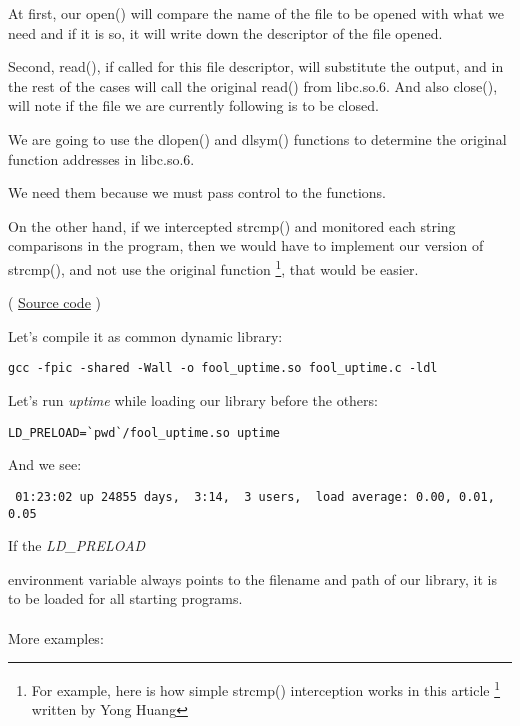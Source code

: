 At first, our open() will compare the name of the file to be opened with what we need and if it is so,
it will write down the descriptor of the file opened.

Second, read(), if called for this file descriptor, will substitute the output,
and in the rest of the cases will call the original read() from libc.so.6.
And also close(), 
will note if the file we are currently following is to be closed.


We are going to use the dlopen() and dlsym() functions to determine the original function addresses in libc.so.6.

We need them because we must pass control to the  functions.


On the other hand, if we intercepted strcmp() and monitored each string
comparisons in the program, then we would have to implement our version of strcmp(), and not
use the original function
\footnote{For example, here is how simple strcmp() interception works in this article
\footnote{\href{https://yurichev.com/mirrors/LD_PRELOAD/Yong%20Huang%20LD_PRELOAD.txt}{yurichev.com}}
written by Yong Huang}, that would be easier.


( \href{\RepoURL/OS/LD_PRELOAD/fool_uptime.c}{Source code} )

Let's compile it as common dynamic library:

\begin{lstlisting}
gcc -fpic -shared -Wall -o fool_uptime.so fool_uptime.c -ldl
\end{lstlisting}

Let's run \emph{uptime}
while loading our library before the others:

\begin{lstlisting}
LD_PRELOAD=`pwd`/fool_uptime.so uptime
\end{lstlisting}

And we see:

\begin{lstlisting}
 01:23:02 up 24855 days,  3:14,  3 users,  load average: 0.00, 0.01, 0.05
\end{lstlisting}

If the \emph{LD\_PRELOAD} 

environment variable always points to the filename and path of our library, 
it is to be loaded for all starting programs. \\
\\
More examples:

